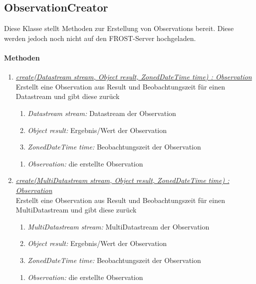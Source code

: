 
\subsection{ObservationCreator}

Diese Klasse stellt Methoden zur Erstellung von Observations bereit.
Diese werden jedoch noch nicht auf den FROST-Server hochgeladen.

\paragraph{Methoden}

\begin{enumerate}[+]
\item \underline{\textit{create(Datastream stream, Object result, ZonedDateTime time) : Observation}}\\
Erstellt eine Observation aus Result und Beobachtungszeit für einen Datastream und gibt diese zurück

\begin{enumerate}[$\bullet$]
\item \textit{Datastream stream:} Datastream der Observation
\item \textit{Object result:} Ergebnis/Wert der Observation
\item \textit{ZonedDateTime time:} Beobachtungszeit der Observation
\end{enumerate}
\vspace{-0.2cm}
\begin{enumerate}[$\circ$]
\item \textit{Observation:} die erstellte Observation
\end{enumerate}

\item \underline{\textit{create(MultiDatastream stream, Object result, ZonedDateTime time) : Observation}}\\
Erstellt eine Observation aus Result und Beobachtungszeit für einen MultiDatastream und gibt diese zurück

\begin{enumerate}[$\bullet$]
\item \textit{MultiDatastream stream:} MultiDatastream der Observation
\item \textit{Object result:} Ergebnis/Wert der Observation
\item \textit{ZonedDateTime time:} Beobachtungszeit der Observation
\end{enumerate}
\vspace{-0.2cm}
\begin{enumerate}[$\circ$]
\item \textit{Observation:} die erstellte Observation
\end{enumerate}


\end{enumerate}
